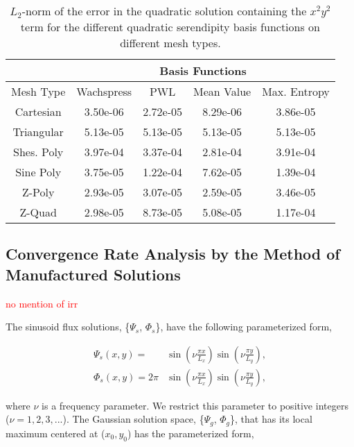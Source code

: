 \documentclass[preprint,10pt]{elsarticle}
\newcommand{\tcr}[1]{\textcolor{red}{#1}}
\begin{document}
%
\begin{table}[hbt]
\caption{$L_2$-norm of the error in the quadratic solution containing the $x^2y^2$ term for the different quadratic serendipity basis functions on different mesh types.}
\centering
\def\arraystretch{1.25}
\begin{tabular}{|c|c|c|c|c|}
\hline
& \multicolumn{4}{c}{Basis Functions}\vline\\
\hline
Mesh Type & Wachspress & PWL& Mean Value& Max. Entropy \\
\hline
Cartesian&3.50e-06&2.72e-05&8.29e-06&3.86e-05\\
Triangular&5.13e-05&5.13e-05&5.13e-05&5.13e-05\\
Shes. Poly&3.97e-04&3.37e-04&2.81e-04&3.91e-04\\
Sine Poly&3.75e-05&1.22e-04&7.62e-05&1.39e-04\\
Z-Poly&2.93e-05&3.07e-05&2.59e-05&3.46e-05\\
Z-Quad&2.98e-05&8.73e-05&5.08e-05&1.17e-04\\
\hline
\end{tabular}
\end{table}

\subsection{Convergence Rate Analysis by the Method of Manufactured Solutions}
\tcr{no mention of irr}

The sinusoid flux solutions, \{$\Psi_s$, $\Phi_s$\}, have the following parameterized form,

\begin{equation}
\label{eq::Results_MMS_sinefluxsols}
\begin{aligned}
\Psi_s (x,y) = &\sin(\nu  \frac{\pi x}{L_x}) \sin(\nu  \frac{\pi y}{L_y}), \\ 
\Phi_s (x,y) = 2 \pi &\sin(\nu  \frac{\pi x}{L_x}) \sin(\nu  \frac{\pi y}{L_y}),
\end{aligned} 
\end{equation}

\noindent where $\nu$ is a frequency parameter. We restrict this parameter to positive integers ($\nu = 1,2,3,...$). The Gaussian solution space, \{$\Psi_g$, $\Phi_g$\}, that has its local maximum centered at ($x_0,y_0$) has the parameterized form,
\end{document}
